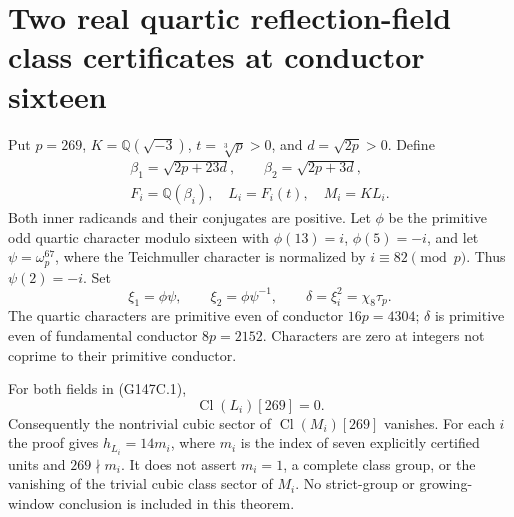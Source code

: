\section{Two real quartic reflection-field class certificates at conductor sixteen}
\label{sec:conductor16-real-quartic-class}

Put $p=269$, $K=\mathbb Q(\sqrt{-3})$, $t=\sqrt[3]p>0$,
and $d=\sqrt{2p}>0$.  Define
\[
 \begin{gathered}
 \beta_1=\sqrt{2p+23d},\qquad \beta_2=\sqrt{2p+3d},\\
 F_i=\mathbb Q(\beta_i),\quad L_i=F_i(t),\quad M_i=KL_i.
 \end{gathered}
 \tag{G147C.1}
\]
Both inner radicands and their conjugates are positive.
Let $\phi$ be the primitive odd quartic character modulo sixteen with
$\phi(13)=i$, $\phi(5)=-i$, and let
$\psi=\omega_p^{67}$, where the Teichmuller character is normalized
by $i\equiv82\pmod p$.  Thus $\psi(2)=-i$.
Set
\[
 \xi_1=\phi\psi,\qquad \xi_2=\phi\psi^{-1},\qquad
 \delta=\xi_i^2=\chi_8\tau_p.
 \tag{G147C.2}
\]
The quartic characters are primitive even of conductor $16p=4304$;
$\delta$ is primitive even of fundamental conductor $8p=2152$.
Characters are zero at integers not coprime to their primitive conductor.

\begin{theorem}
\label{AC-G147-class}
For both fields in (G147C.1),
\[
                      \operatorname{Cl}(L_i)[269]=0.
 \tag{G147C.3}
\]
Consequently the nontrivial cubic sector of
$\operatorname{Cl}(M_i)[269]$ vanishes.
For each $i$ the proof gives $h_{L_i}=14m_i$, where $m_i$ is the
index of seven explicitly certified units and $269\nmid m_i$.
It does not assert $m_i=1$, a complete class group, or the vanishing
of the trivial cubic class sector of $M_i$.
No strict-group or growing-window conclusion is included in this theorem.
\end{theorem}

